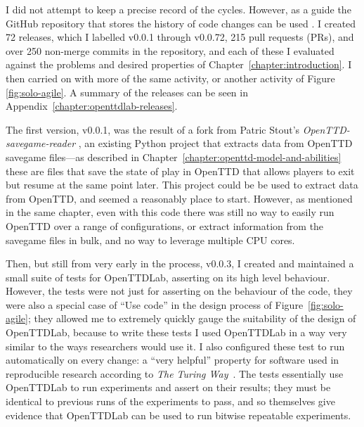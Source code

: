 \documentclass[logo,msc,dsti]{style/infthesis}    %
\begin{document}
{I did not attempt to keep a precise record of the cycles. However, as a guide the GitHub repository that stores the history of code changes can be used \cite{OpenTTDLab}. I created 72 releases, which I labelled v0.0.1 through v0.0.72, 215 pull requests (PRs), and over 250 non-merge commits in the repository, and each of these I evaluated against the problems and desired properties of Chapter~\ref{chapter:introduction}. I then carried on with more of the same activity, or another activity of Figure \ref{fig:solo-agile}. A summary of the releases can be seen in Appendix~\ref{chapter:openttdlab-releases}.

The first version, v0.0.1, was the result of a fork from Patric Stout's \emph{OpenTTD-savegame-reader} \cite{Stout2024}, an existing Python project that extracts data from OpenTTD savegame files---as described in Chapter~\ref{chapter:openttd-model-and-abilities} these are files that save the state of play in OpenTTD that allows players to exit but resume at the same point later. This project could be be used to extract data from OpenTTD, and seemed a reasonably place to start. However, as mentioned in the same chapter, even with this code there was still no way to easily run OpenTTD over a range of configurations, or extract information from the savegame files in bulk, and no way to leverage multiple CPU cores.

Then, but still from very early in the process, v0.0.3, I created and maintained a small suite of tests for OpenTTDLab, asserting on its high level behaviour. However, the tests were not just for asserting on the behaviour of the code, they were also a special case of ``Use code'' in the design process of Figure~\ref{fig:solo-agile}; they allowed me to extremely quickly gauge the suitability of the design of OpenTTDLab, because to write these tests I used OpenTTDLab in a way very similar to the ways researchers would use it. I also configured these test to run automatically on every change: a ``very helpful'' property for software used in reproducible research according to \emph{The Turing Way}~\cite{turingway2022}. The tests essentially use OpenTTDLab to run experiments and assert on their results; they must be identical to previous runs of the experiments to pass, and so themselves give evidence that OpenTTDLab can be used to run bitwise repeatable experiments.

}
\end{document}
